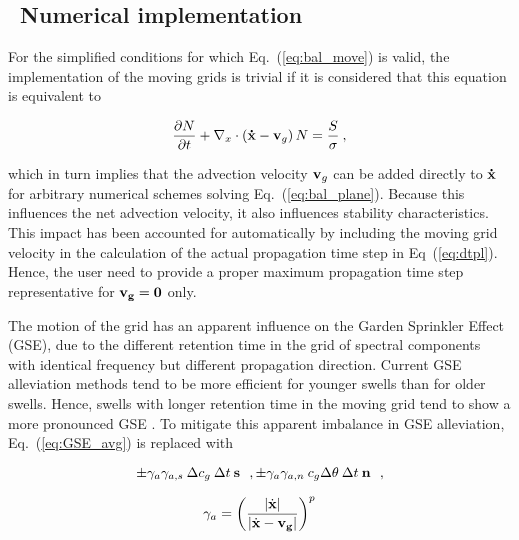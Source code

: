 \vssub
\subsection{~Numerical implementation} \label{sec:move_num}
\vssub

For the simplified conditions for which Eq.~(\ref{eq:bal_move}) is valid, the
implementation of the moving grids is trivial if it is considered that this
equation is equivalent to

\begin{equation}
\frac{\partial N}{\partial t} + 
\nabla_x \cdot \left ( {\bf\dot{x}}-{\bf{v}}_g \right ) N  = 
\frac{S}{\sigma} \: , \label{eq:bal_move2}
\end{equation}

\noindent
which in turn implies that the advection velocity ${\bf{v}}_g$ can be added
directly to ${\bf\dot{x}}$ for arbitrary numerical schemes solving
Eq.~(\ref{eq:bal_plane}). Because this influences the net advection velocity,
it also influences stability characteristics. This impact has been accounted
for automatically by including the moving grid velocity in the calculation of
the actual propagation time step in Eq~(\ref{eq:dtpl}). Hence, the user need
to provide a proper maximum propagation time step representative for $\bf{v}_g
= 0$ only.

The motion of the grid has an apparent influence on the Garden Sprinkler
Effect (GSE), due to the different retention time in the grid of spectral
components with identical frequency but different propagation direction.
Current GSE alleviation methods tend to be more efficient for younger swells
than for older swells. Hence, swells with longer retention time in the moving
grid tend to show a more pronounced GSE \citep[see][]{tol:OMOD05b}. To
mitigate this apparent imbalance in GSE alleviation,  Eq.~(\ref{eq:GSE_avg}) is
replaced with

\begin{equation}
\pm \gamma_a \gamma_{a,s} \: \Delta c_g \: \Delta t \: \mbox{\bf s} \:\:\: ,
\pm \gamma_a \gamma_{a,n} \: c_g \Delta \theta \: \Delta t \: \mbox{\bf n} \:\:\: ,
\label{eq:move_GSE_avg1}
\end{equation}

\begin{equation}
\gamma_a = \left ( \frac{|\dot{\bf{x}}|}{|\dot{\bf{x}}-\bf{v}_g|}
\right ) ^{p}
\label{eq:move_GSE_avg2}
\end{equation}


